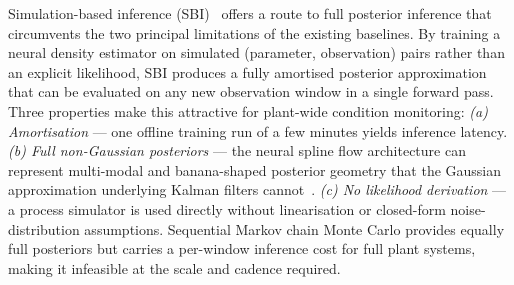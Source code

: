 \documentclass[aps,pre,twocolumn,superscriptaddress]{revtex4-2}
\begin{document}
Simulation-based inference (SBI)~\citep{Cranmer2020} offers a route to full posterior inference that circumvents the two principal limitations of the existing baselines. By training a neural density estimator on simulated (parameter, observation) pairs rather than an explicit likelihood, SBI produces a fully amortised posterior approximation~\citep{Greenberg2019} that can be evaluated on any new observation window in a single forward pass. Three properties make this attractive for plant-wide condition monitoring:
\emph{(a) Amortisation} --- one offline training run of a few minutes yields
inference latency.
\emph{(b) Full non-Gaussian posteriors} --- the neural spline flow
architecture can represent multi-modal and banana-shaped
posterior geometry that the Gaussian approximation underlying Kalman filters cannot~\citep{Durkan2019}.
\emph{(c) No likelihood derivation} --- a process simulator is used directly without linearisation or closed-form noise-distribution assumptions.
Sequential Markov chain Monte Carlo provides equally full posteriors but carries a per-window inference cost for full plant systems, making it infeasible at the scale and cadence required.
\end{document}
